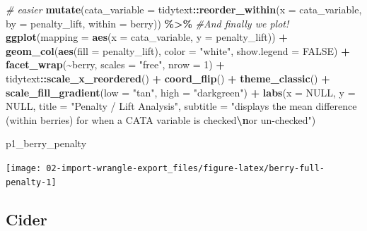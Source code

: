 \documentclass[
]{book}
\newenvironment{Shaded}{\begin{snugshade}}{\end{snugshade}}
\newcommand{\AttributeTok}[1]{\textcolor[rgb]{0.13,0.29,0.53}{#1}}
\newcommand{\CommentTok}[1]{\textcolor[rgb]{0.56,0.35,0.01}{\textit{#1}}}
\newcommand{\ConstantTok}[1]{\textcolor[rgb]{0.56,0.35,0.01}{#1}}
\newcommand{\DecValTok}[1]{\textcolor[rgb]{0.00,0.00,0.81}{#1}}
\newcommand{\FunctionTok}[1]{\textcolor[rgb]{0.13,0.29,0.53}{\textbf{#1}}}
\newcommand{\NormalTok}[1]{#1}
\newcommand{\SpecialCharTok}[1]{\textcolor[rgb]{0.81,0.36,0.00}{\textbf{#1}}}
\newcommand{\StringTok}[1]{\textcolor[rgb]{0.31,0.60,0.02}{#1}}
\begin{document}
\begin{Shaded}
\begin{Highlighting}[]
  \CommentTok{\# easier}
  \FunctionTok{mutate}\NormalTok{(}\AttributeTok{cata\_variable =}\NormalTok{ tidytext}\SpecialCharTok{::}\FunctionTok{reorder\_within}\NormalTok{(}\AttributeTok{x =}\NormalTok{ cata\_variable,}
                                                  \AttributeTok{by =}\NormalTok{ penalty\_lift,}
                                                  \AttributeTok{within =}\NormalTok{ berry)) }\SpecialCharTok{\%\textgreater{}\%}
  \CommentTok{\#And finally we plot!}
  \FunctionTok{ggplot}\NormalTok{(}\AttributeTok{mapping =} \FunctionTok{aes}\NormalTok{(}\AttributeTok{x =}\NormalTok{ cata\_variable, }\AttributeTok{y =}\NormalTok{ penalty\_lift)) }\SpecialCharTok{+}
  \FunctionTok{geom\_col}\NormalTok{(}\FunctionTok{aes}\NormalTok{(}\AttributeTok{fill =}\NormalTok{ penalty\_lift), }\AttributeTok{color =} \StringTok{"white"}\NormalTok{, }\AttributeTok{show.legend =} \ConstantTok{FALSE}\NormalTok{) }\SpecialCharTok{+} 
  \FunctionTok{facet\_wrap}\NormalTok{(}\SpecialCharTok{\textasciitilde{}}\NormalTok{berry, }\AttributeTok{scales =} \StringTok{"free"}\NormalTok{, }\AttributeTok{nrow =} \DecValTok{1}\NormalTok{) }\SpecialCharTok{+} 
\NormalTok{  tidytext}\SpecialCharTok{::}\FunctionTok{scale\_x\_reordered}\NormalTok{() }\SpecialCharTok{+} 
  \FunctionTok{coord\_flip}\NormalTok{() }\SpecialCharTok{+} 
  \FunctionTok{theme\_classic}\NormalTok{() }\SpecialCharTok{+} 
  \FunctionTok{scale\_fill\_gradient}\NormalTok{(}\AttributeTok{low =} \StringTok{"tan"}\NormalTok{, }\AttributeTok{high =} \StringTok{"darkgreen"}\NormalTok{) }\SpecialCharTok{+} 
  \FunctionTok{labs}\NormalTok{(}\AttributeTok{x =} \ConstantTok{NULL}\NormalTok{, }\AttributeTok{y =} \ConstantTok{NULL}\NormalTok{,}
       \AttributeTok{title =} \StringTok{"Penalty / Lift Analysis"}\NormalTok{,}
       \AttributeTok{subtitle =} \StringTok{"displays the mean difference (within berries) for when a CATA variable is checked}\SpecialCharTok{\textbackslash{}n}\StringTok{or un{-}checked"}\NormalTok{)}

\NormalTok{p1\_berry\_penalty}
\end{Highlighting}
\end{Shaded}

\begin{center}\texttt{[image: 02-import-wrangle-export\_files/figure-latex/berry-full-penalty-1]} \end{center}

\hypertarget{cider}{%
\subsection{Cider}\label{cider}}
\end{document}
